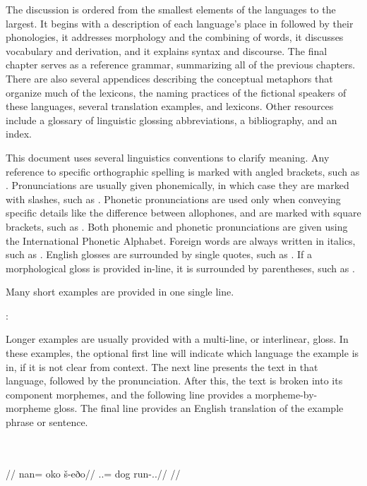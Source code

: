 The discussion is ordered from the smallest elements of the languages to the largest. It begins with a description of each language's place in \landn{} followed by their phonologies, it addresses morphology and the combining of words, it discusses vocabulary and derivation, and it explains syntax and discourse. The final chapter serves as a reference grammar, summarizing all of the previous chapters. There are also several appendices describing the conceptual metaphors that organize much of the lexicons, the naming practices of the fictional speakers of these languages, several translation examples, and lexicons. Other resources include a glossary of linguistic glossing abbreviations, a bibliography, and an index.

This document uses several linguistics conventions to clarify meaning. Any reference to specific orthographic spelling is marked with angled brackets, such as . Pronunciations are usually given phonemically, in which case they are marked with slashes, such as . Phonetic pronunciations are used only when conveying specific details like the difference between allophones, and are marked with square brackets, such as . Both phonemic and phonetic pronunciations are given using the International Phonetic Alphabet. Foreign words are always written in italics, such as . English glosses are surrounded by single quotes, such as . If a morphological gloss is provided in-line, it is surrounded by parentheses, such as \gloss{\Inf}.

Many short examples are provided in one single line.

	\langtvk:    
\xe

Longer examples are usually provided with a multi-line, or interlinear, gloss. In these examples, the optional first line will indicate which language the example is in, if it is not clear from context. The next line presents the text in that language, followed by the pronunciation. After this, the text is broken into its component morphemes, and the following line provides a morpheme-by-morpheme gloss. The final line provides an English translation of the example phrase or sentence.

	\begingl
		\glpreamble \langtvk\\
		\\
		//
		\gla nan= oko š-eðo//
		\glb \Pl.\An.\Top= dog run-\Ind.\Pst.\Prg//
		\glft {}//
	\endgl
\xe

